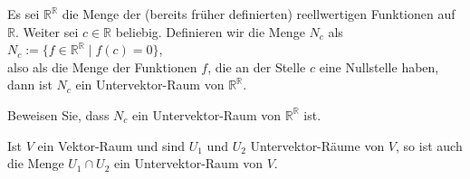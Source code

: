 \example
Es sei $\mathbb{R}^{\mathbb{R}}$ die Menge der (bereits fr\"{u}her definierten) reellwertigen Funktionen
auf $\mathbb{R}$.
Weiter sei $c \in \mathbb{R}$ beliebig.  Definieren wir die Menge $N_c$ als
\\[0.2cm]
\hspace*{1.3cm}
$N_c := \{ f \in \mathbb{R}^{\mathbb{R}} \mid f(c) = 0 \}$,
\\[0.2cm]
also als die Menge der Funktionen $f$, die an der Stelle $c$ eine Nullstelle haben, dann ist
$N_c$ ein Untervektor-Raum von $\mathbb{R}^{\mathbb{R}}$.

\exercise
Beweisen Sie, dass $N_c$ ein Untervektor-Raum von $\mathbb{R}^{\mathbb{R}}$ ist.
\eox

\begin{Satz}
  Ist $V$ ein Vektor-Raum und sind $U_1$ und $U_2$ Untervektor-R\"{a}ume von $V$, so ist auch die Menge
  $U_1 \cap U_2$ ein Untervektor-Raum von $V$.
\end{Satz}

